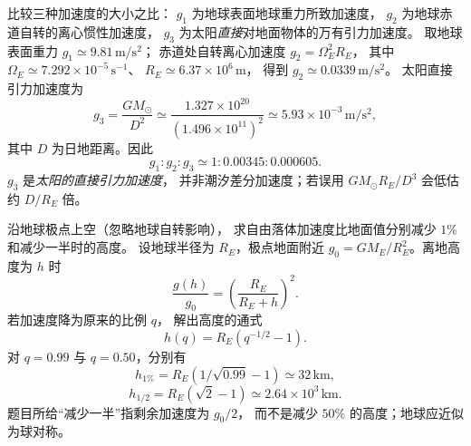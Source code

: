 比较三种加速度的大小之比：
$g_1$ 为地球表面地球重力所致加速度，
$g_2$ 为地球赤道自转的离心惯性加速度，
$g_3$ 为太阳\emph{直接}对地面物体的万有引力加速度。
\exsolution
取地球表面重力
$g_1\simeq9.81\,\mathrm{m/s^2}$；
赤道处自转离心加速度
$g_2=\Omega_E^2R_E$，
其中 $\Omega_E\simeq7.292\times10^{-5}\,\mathrm{s^{-1}}$、
$R_E\simeq6.37\times10^6\,\mathrm m$，
得到 $g_2\simeq0.0339\,\mathrm{m/s^2}$。
太阳直接引力加速度为
\[
g_3=\frac{GM_\odot}{D^2}
\simeq\frac{1.327\times10^{20}}
{(1.496\times10^{11})^2}
\simeq5.93\times10^{-3}\,\mathrm{m/s^2},
\]
其中 $D$ 为日地距离。因此
\[
\boxed{g_1:g_2:g_3
\simeq1:0.00345:0.000605}.
\]
\excheck $g_3$ 是\emph{太阳的直接引力加速度}，
并非潮汐差分加速度；若误用
$GM_\odot R_E/D^3$ 会低估约 $D/R_E$ 倍。

沿地球极点上空（忽略地球自转影响），
求自由落体加速度比地面值分别减少
$1\%$ 和减少一半时的高度。
\exsolution
设地球半径为 $R_E$，极点地面附近
$g_0=GM_E/R_E^2$。离地高度为 $h$ 时
\[
\frac{g(h)}{g_0}
=\left(\frac{R_E}{R_E+h}\right)^2.
\]
若加速度降为原来的比例 $q$，
解出高度的通式
\[
\boxed{h(q)=R_E(q^{-1/2}-1)}.
\]
对 $q=0.99$ 与 $q=0.50$，分别有
\[
\boxed{h_{1\%}=R_E(1/\sqrt{0.99}-1)
\simeq32\,\mathrm{km}},
\]
\[
\boxed{h_{1/2}=R_E(\sqrt2-1)
\simeq2.64\times10^3\,\mathrm{km}}.
\]
\excheck 题目所给“减少一半”指剩余加速度为 $g_0/2$，
而不是减少 $50\%$ 的高度；地球应近似为球对称。
